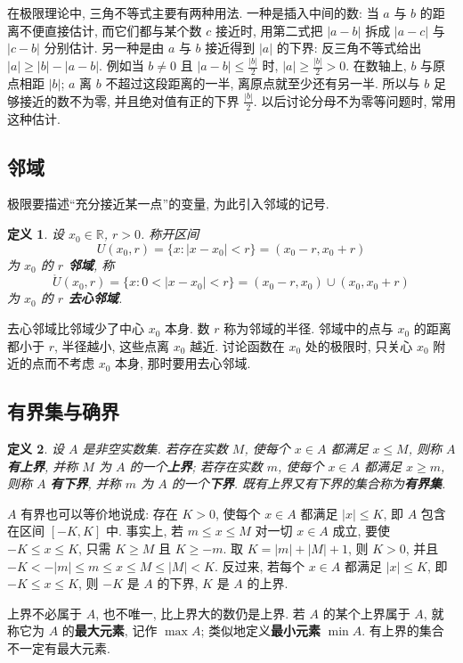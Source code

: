 \documentclass[UTF8,openany]{ctexbook}
\theoremstyle{chinesetextbook}
\newtheorem{definition}{定义}[section]
\begin{document}
在极限理论中, 三角不等式主要有两种用法. 一种是插入中间的数: 当 $a$ 与 $b$ 的距离不便直接估计, 而它们都与某个数 $c$ 接近时, 用第二式把 $|a-b|$ 拆成 $|a-c|$ 与 $|c-b|$ 分别估计. 另一种是由 $a$ 与 $b$ 接近得到 $|a|$ 的下界: 反三角不等式给出 $|a|\ge|b|-|a-b|$. 例如当 $b\ne0$ 且 $\displaystyle|a-b|\le\frac{|b|}2$ 时, $\displaystyle|a|\ge\frac{|b|}2>0$. 在数轴上, $b$ 与原点相距 $|b|$; $a$ 离 $b$ 不超过这段距离的一半, 离原点就至少还有另一半. 所以与 $b$ 足够接近的数不为零, 并且绝对值有正的下界 $\displaystyle\frac{|b|}2$. 以后讨论分母不为零等问题时, 常用这种估计.
\subsection{邻域}
极限要描述“充分接近某一点”的变量, 为此引入邻域的记号.
\begin{definition}
设 $x_0\in\mathbb R$, $r>0$. 称开区间
\[
U(x_0,r)=\{x:|x-x_0|<r\}=(x_0-r,x_0+r)
\]
为 $x_0$ 的 \textbf{$r$ 邻域}, 称
\[
\mathring U(x_0,r)=\{x:0<|x-x_0|<r\}=(x_0-r,x_0)\cup(x_0,x_0+r)
\]
为 $x_0$ 的 \textbf{$r$ 去心邻域}.
\end{definition}
去心邻域比邻域少了中心 $x_0$ 本身. 数 $r$ 称为邻域的半径. 邻域中的点与 $x_0$ 的距离都小于 $r$, 半径越小, 这些点离 $x_0$ 越近. 讨论函数在 $x_0$ 处的极限时, 只关心 $x_0$ 附近的点而不考虑 $x_0$ 本身, 那时要用去心邻域.
\subsection{有界集与确界}
\begin{definition}
设 $A$ 是非空实数集. 若存在实数 $M$, 使每个 $x\in A$ 都满足 $x\le M$, 则称 $A$ \textbf{有上界}, 并称 $M$ 为 $A$ 的一个\textbf{上界}; 若存在实数 $m$, 使每个 $x\in A$ 都满足 $x\ge m$, 则称 $A$ \textbf{有下界}, 并称 $m$ 为 $A$ 的一个\textbf{下界}. 既有上界又有下界的集合称为\textbf{有界集}.
\end{definition}
$A$ 有界也可以等价地说成: 存在 $K>0$, 使每个 $x\in A$ 都满足 $|x|\le K$, 即 $A$ 包含在区间 $[-K,K]$ 中. 事实上, 若 $m\le x\le M$ 对一切 $x\in A$ 成立, 要使 $-K\le x\le K$, 只需 $K\ge M$ 且 $K\ge-m$. 取 $K=|m|+|M|+1$, 则 $K>0$, 并且 $-K<-|m|\le m\le x\le M\le|M|<K$. 反过来, 若每个 $x\in A$ 都满足 $|x|\le K$, 即 $-K\le x\le K$, 则 $-K$ 是 $A$ 的下界, $K$ 是 $A$ 的上界.

上界不必属于 $A$, 也不唯一, 比上界大的数仍是上界. 若 $A$ 的某个上界属于 $A$, 就称它为 $A$ 的\textbf{最大元素}, 记作 $\max A$; 类似地定义\textbf{最小元素} $\min A$. 有上界的集合不一定有最大元素.
\end{document}
